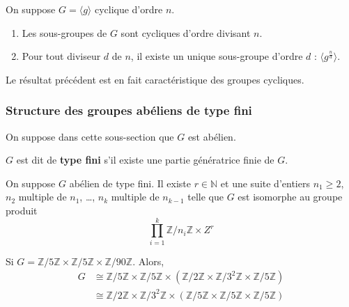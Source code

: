   \begin{theorem}
    On suppose $G = \langle g \rangle$ cyclique d'ordre $n$.
    \begin{enumerate}[label=(\roman*)]
      \item Les sous-groupes de $G$ sont cycliques d'ordre divisant $n$.
      \item Pour tout diviseur $d$ de $n$, il existe un unique sous-groupe d'ordre $d$ : $\langle g^{\frac{n}{d}} \rangle$.
    \end{enumerate}
  \end{theorem}

  \begin{remark}
    Le résultat précédent est en fait caractéristique des groupes cycliques.
  \end{remark}

  \subsubsection{Structure des groupes abéliens de type fini}


  On suppose dans cette sous-section que $G$ est abélien.

  \begin{definition}
    $G$ est dit de \textbf{type fini} s'il existe une partie génératrice finie de $G$.
  \end{definition}


  \begin{theorem}[Kronecker]
    On suppose $G$ abélien de type fini. Il existe $r \in \mathbb{N}$ et une suite d'entiers $n_1 \geq 2$, $n_2$ multiple de $n_1$, \dots, $n_k$ multiple de $n_{k-1}$ telle que $G$ est isomorphe au groupe produit
    \[ \prod_{i=1}^k \mathbb{Z}/n_i\mathbb{Z} \times Z^r \]
  \end{theorem}

  \begin{example}
    Si $G = \mathbb{Z}/5\mathbb{Z} \times \mathbb{Z}/5\mathbb{Z} \times \mathbb{Z}/90\mathbb{Z}$. Alors,
    \begin{align*}
      G &\cong \mathbb{Z}/5\mathbb{Z} \times \mathbb{Z}/5\mathbb{Z} \times (\mathbb{Z}/2\mathbb{Z} \times \mathbb{Z}/3^2\mathbb{Z} \times \mathbb{Z}/5\mathbb{Z}) \\
      &\cong \mathbb{Z}/2\mathbb{Z} \times \mathbb{Z}/3^2\mathbb{Z} \times (\mathbb{Z}/5\mathbb{Z} \times \mathbb{Z}/5\mathbb{Z} \times \mathbb{Z}/5\mathbb{Z})
    \end{align*}
  \end{example}

